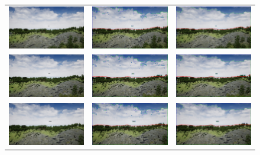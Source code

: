 \begin{figure}
\begin{tabular}{ccc}
    \includegraphics[width=.27\linewidth]{images/airsim_thresh/img_9.jpg} &
    \includegraphics[width=.27\linewidth]{images/airsim_thresh/img_adaptive_9.jpg} &
    \includegraphics[width=.27\linewidth]{images/airsim_thresh/img_thresh_9.jpg} \\
    
    \includegraphics[width=.27\linewidth]{images/airsim_thresh/img_10.jpg} &
    \includegraphics[width=.27\linewidth]{images/airsim_thresh/img_adaptive_10.jpg} &
    \includegraphics[width=.27\linewidth]{images/airsim_thresh/img_thresh_10.jpg} \\
    
    \includegraphics[width=.27\linewidth]{images/airsim_thresh/img_11.jpg} &
    \includegraphics[width=.27\linewidth]{images/airsim_thresh/img_adaptive_11.jpg} &
    \includegraphics[width=.27\linewidth]{images/airsim_thresh/img_thresh_11.jpg} \\
    

\end{tabular}
\end{figure}
